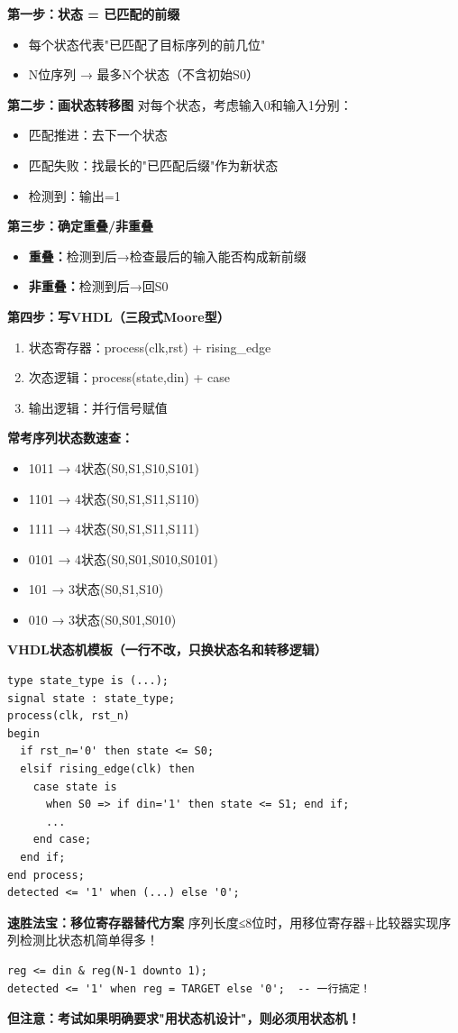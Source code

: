 \begin{quickkill}

\textbf{第一步：状态 = 已匹配的前缀}
\begin{itemize}
  \item 每个状态代表"已匹配了目标序列的前几位"
  \item N位序列 → 最多N个状态（不含初始S0）
\end{itemize}

\textbf{第二步：画状态转移图}
对每个状态，考虑输入0和输入1分别：
\begin{itemize}
  \item 匹配推进：去下一个状态
  \item 匹配失败：找最长的"已匹配后缀"作为新状态
  \item 检测到：输出=1
\end{itemize}

\textbf{第三步：确定重叠/非重叠}
\begin{itemize}
  \item \textbf{重叠：}检测到后→检查最后的输入能否构成新前缀
  \item \textbf{非重叠：}检测到后→回S0
\end{itemize}

\textbf{第四步：写VHDL（三段式Moore型）}
\begin{enumerate}
  \item 状态寄存器：process(clk,rst) + rising\_edge
  \item 次态逻辑：process(state,din) + case
  \item 输出逻辑：并行信号赋值
\end{enumerate}

\textbf{常考序列状态数速查：}
\begin{itemize}
  \item 1011 → 4状态(S0,S1,S10,S101)
  \item 1101 → 4状态(S0,S1,S11,S110)
  \item 1111 → 4状态(S0,S1,S11,S111)
  \item 0101 → 4状态(S0,S01,S010,S0101)
  \item 101 → 3状态(S0,S1,S10)
  \item 010 → 3状态(S0,S01,S010)
\end{itemize}

\textbf{VHDL状态机模板（一行不改，只换状态名和转移逻辑）}
\begin{lstlisting}
type state_type is (...);
signal state : state_type;
process(clk, rst_n)
begin
  if rst_n='0' then state <= S0;
  elsif rising_edge(clk) then
    case state is
      when S0 => if din='1' then state <= S1; end if;
      ...
    end case;
  end if;
end process;
detected <= '1' when (...) else '0';
\end{lstlisting}

\textbf{速胜法宝：移位寄存器替代方案}
序列长度≤8位时，用移位寄存器+比较器实现序列检测比状态机简单得多！

\begin{lstlisting}
reg <= din & reg(N-1 downto 1);
detected <= '1' when reg = TARGET else '0';  -- 一行搞定！
\end{lstlisting}

\textbf{但注意：考试如果明确要求"用状态机设计"，则必须用状态机！}
\end{quickkill}
